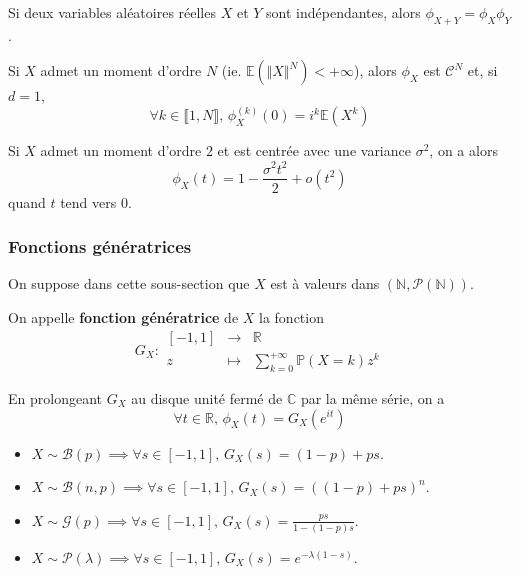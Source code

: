  \begin{corollary}
    Si deux variables aléatoires réelles $X$ et $Y$ sont indépendantes, alors $\phi_{X+Y} = \phi_X \phi_Y$.
  \end{corollary}

  \begin{theorem}
    Si $X$ admet un moment d'ordre $N$ (ie. $\mathbb{E}(\Vert X \Vert^N) < +\infty$), alors $\phi_X$ est $\mathcal{C}^N$ et, si $d = 1$,
    \[ \forall k \in \llbracket 1, N \rrbracket, \, \phi_X^{(k)}(0) = i^k \mathbb{E}(X^k) \]
  \end{theorem}

  \begin{example}
    Si $X$ admet un moment d'ordre $2$ et est centrée avec une variance $\sigma^2$, on a alors
    \[ \phi_X(t) = 1 - \frac{\sigma^2 t^2}{2} + o(t^2) \]
    quand $t$ tend vers $0$.
  \end{example}

  \subsubsection{Fonctions génératrices}

  On suppose dans cette sous-section que $X$ est à valeurs dans $(\mathbb{N}, \mathcal{P}(\mathbb{N}))$.


  \begin{definition}
    On appelle \textbf{fonction génératrice} de $X$ la fonction
    \[
    G_X :
    \begin{array}{ccc}
      [-1,1] &\rightarrow& \mathbb{R} \\
      z &\mapsto& \sum_{k=0}^{+\infty} \mathbb{P}(X=k) z^k
    \end{array}
    \]
  \end{definition}


  \begin{remark}
    En prolongeant $G_X$ au disque unité fermé de $\mathbb{C}$ par la même série, on a
    \[ \forall t \in \mathbb{R}, \, \phi_X(t) = G_X(e^{it}) \]
  \end{remark}


  \begin{example}
    \begin{itemize}
      \item $X \sim \mathcal{B}(p) \implies \forall s \in [-1,1], \, G_X(s) = (1-p) + ps$.
      \item $X \sim \mathcal{B}(n, p) \implies \forall s \in [-1,1], \, G_X(s) = ((1-p) + ps)^n$.
      \item $X \sim \mathcal{G}(p) \implies \forall s \in [-1,1], \, G_X(s) = \frac{ps}{1-(1-p)s}$.
      \item $X \sim \mathcal{P}(\lambda) \implies \forall s \in [-1,1], \, G_X(s) = e^{-\lambda (1-s)}$.
    \end{itemize}
  \end{example}

